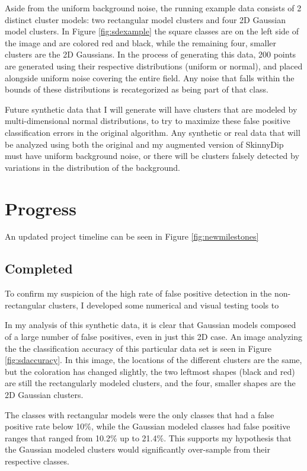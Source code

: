 \documentclass{sig-alternate-05-2015}
\begin{document}
Aside from the uniform background noise, the running example data consists of 2 distinct cluster models: two rectangular model clusters and four 2D Gaussian model clusters. In Figure \ref{fig:sdexample} the square classes are on the left side of the image and are colored red and black, while the remaining four, smaller clusters are the 2D Gaussians. In the process of generating this data, 200 points are generated using their respective distributions (uniform or normal), and placed alongside uniform noise covering the entire field. Any noise that falls within the bounds of these distributions is recategorized as being part of that class.

Future synthetic data that I will generate will have clusters that are modeled by multi-dimensional normal distributions, to try to maximize these false positive classification errors in the original algorithm. Any synthetic or real data that will be analyzed using both the original and my augmented version of SkinnyDip must have uniform background noise, or there will be clusters falsely detected by variations in the distribution of the background.

\section{Progress}
An updated project timeline can be seen in Figure \ref{fig:newmilestones}
\subsection{Completed}
To confirm my suspicion of the high rate of false positive detection in the non-rectangular clusters, I developed some numerical and visual testing tools to 

In my analysis of this synthetic data, it is clear that Gaussian models composed of a large number of false positives, even in just this 2D case. An image analyzing the the classification accuracy of this particular data set is seen in Figure \ref{fig:sdaccuracy}. In this image, the locations of the different clusters are the same, but the coloration has changed slightly, the two leftmost shapes (black and red) are still the rectangularly modeled clusters, and the four, smaller shapes are the 2D Gaussian clusters.

The classes with rectangular models were the only classes that had a false positive rate below 10\%, while the Gaussian modeled classes had false positive ranges that ranged from 10.2\% up to 21.4\%. This supports my hypothesis that the Gaussian modeled clusters would significantly over-sample from their respective classes.
\end{document}
